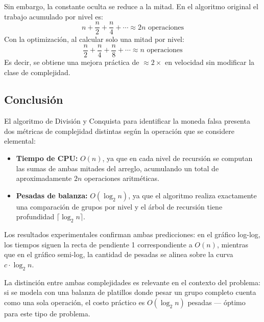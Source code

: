 Sin embargo, la constante oculta se reduce a la mitad. En el algoritmo original el trabajo acumulado por nivel es:
\[
n + \frac{n}{2} + \frac{n}{4} + \cdots \approx 2n \text{ operaciones}
\]
Con la optimización, al calcular solo una mitad por nivel:
\[
\frac{n}{2} + \frac{n}{4} + \frac{n}{8} + \cdots \approx n \text{ operaciones}
\]
Es decir, se obtiene una mejora práctica de $\approx 2\times$ en velocidad sin modificar la clase de complejidad.

\subsection{Conclusión}

El algoritmo de División y Conquista para identificar la moneda falsa
presenta dos métricas de complejidad distintas según la operación que se
considere elemental:

\begin{itemize}
    \item \textbf{Tiempo de CPU:} $O(n)$, ya que en cada nivel de recursión
    se computan las sumas de ambas mitades del arreglo, acumulando un total
    de aproximadamente $2n$ operaciones aritméticas.
    \item \textbf{Pesadas de balanza:} $O(\log_2 n)$, ya que el algoritmo
    realiza exactamente una comparación de grupos por nivel y el árbol de
    recursión tiene profundidad $\lceil \log_2 n \rceil$.
\end{itemize}

Los resultados experimentales confirman ambas predicciones: en el gráfico
log-log, los tiempos siguen la recta de pendiente 1 correspondiente a
$O(n)$, mientras que en el gráfico semi-log, la cantidad de pesadas se
alinea sobre la curva $c \cdot \log_2 n$.

La distinción entre ambas complejidades es relevante en el contexto del
problema: si se modela con una balanza de platillos donde pesar un grupo
completo cuenta como una sola operación, el costo práctico es
$O(\log_2 n)$ pesadas — óptimo para este tipo de problema.
